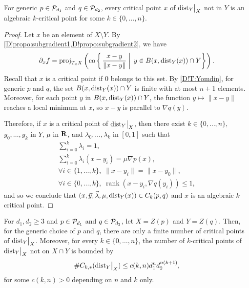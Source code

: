 \begin{lemma}
\label{D!L:algebraic-critical-points}
  For generic $p\in \mathcal{P}_{d_1}$ and $q\in \mathcal{P}_{d_2}$, every critical point $x$ of $\mathord{\operatorname{dist}}_Y\big|_X$ not in $Y$ is an algebraic $k$-critical point for some $k \in \{0, \ldots, n\}$.
\end{lemma}

\begin{proof}
  Let $x$ be an element of {$X \setminus Y$}. By \cref{D!propo:subgradient1,D!propo:subgradient2}, we have
  \[
    \partial_x f = \operatorname{proj}_{T_x X} \left( \operatorname{co} \left\{ \left. \frac{x - y}{\| x - y\|} \; \right| \; y \in B(x, \operatorname{dist}_Y(x)) \cap Y \right\} \right).
  \]
  Recall that $x$ is a critical point if $0$ belongs to this set. By \cref{D!T:Yomdin}, for generic $p$ and $q$, the set $B(x, \operatorname{dist}_Y(x)) \cap Y$ is finite with at most $n + 1$ elements. Moreover, for each point $y$ in $B(x, \operatorname{dist}_Y(x)) \cap Y$, the function $y \mapsto \| x - y \|$ reaches a local minimum at $x$, so $x - y$ is parallel to $\nabla q(y)$.

  Therefore, if $x$ is a critical point of $\mathord{\operatorname{dist}}_Y\big|_X$, then there exist $k \in \{0, \ldots, n\}$, $y_0, \ldots, y_k$ in $Y$, $\mu$ in $\mathbf{R}$, and $\lambda_0, \ldots, \lambda_k$ in $[0, 1]$ such that
  \begin{equation}
  \label{D!eq:criticalabove}
    \begin{gathered}
      \sum_{i = 0}^k \lambda_i = 1, \\
      \sum_{i = 0}^k \lambda_i (x - y_i) = \mu \nabla p(x), \\
      \forall i \in \{1, \ldots, k\}, \; \| x - y_i \| = \| x - y_0 \|, \\
      \forall i \in \{0, \ldots, k\}, \; \operatorname{rank}(x - y_i, \nabla q(y_i)) \leq 1,
    \end{gathered}
  \end{equation}
  and so we conclude that $(x, \vec{y}, \vec{\lambda}, \mu, \operatorname{dist}_Y(x)) \in C_k(p, q)$ and $x$ is an algebraic $k$-critical point.
\end{proof}

\begin{theorem}
\label{D!T:finite-crit-pt}
  For $d_1, d_2 \geq 3$ and $p \in \mathcal{P}_{d_1}$ and $q\in \mathcal{P}_{d_2}$, let $X=Z(p)$ and $Y=Z(q)$. Then, for the generic choice of $p$ and $q$, there are only a finite number of critical points of $\mathord{\operatorname{dist}}_Y\big|_X$. Moreover, for every $k\in \{0, \ldots, n\}$, the number of $k$-critical points of $\mathord{\operatorname{dist}}_Y\big|_X$ not on $X\cap Y$ is bounded by
  $$\#C_{k, *}(\mathord{\operatorname{dist}}_Y\big|_X)\leq c(k,n)d_1^nd_2^{n(k+1)},$$
  for some $c(k,n)>0$ depending on $n$ and $k$ only.
\end{theorem}

